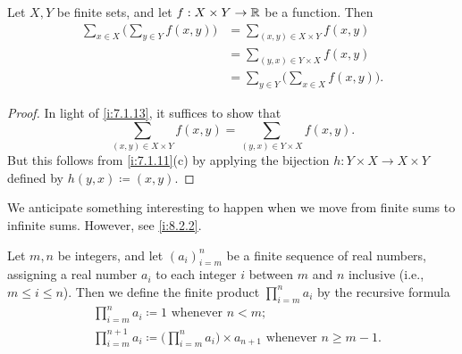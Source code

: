 \begin{cor}\label{i:7.1.14}
  Let \(X, Y\) be finite sets, and let \(f : X \times Y \to \mathbb{R}\) be a function.
  Then
  \begin{align*}
    \sum_{x \in X} \bigg(\sum_{y \in Y} f(x, y)\bigg) & = \sum_{(x, y) \in X \times Y} f(x, y)               \\
                                                      & = \sum_{(y, x) \in Y \times X} f(x, y)               \\
                                                      & = \sum_{y \in Y} \bigg(\sum_{x \in X} f(x, y)\bigg).
  \end{align*}
\end{cor}

\begin{proof}
  In light of \cref{i:7.1.13}, it suffices to show that
  \[
    \sum_{(x, y) \in X \times Y} f(x, y) = \sum_{(y, x) \in Y \times X} f(x, y).
  \]
  But this follows from \cref{i:7.1.11}(c) by applying the bijection \(h : Y \times X \to X \times Y\) defined by \(h(y, x) \coloneqq (x, y)\).
\end{proof}

\begin{rmk}\label{i:7.1.15}
  We anticipate something interesting to happen when we move from finite sums to infinite sums.
  However, see \cref{i:8.2.2}.
\end{rmk}

\begin{ac}\label{i:ac:7.1.1}
  Let \(m, n\) be integers, and let \((a_i)_{i = m}^n\) be a finite sequence of real numbers, assigning a real number \(a_i\) to each integer \(i\) between \(m\) and \(n\) inclusive (i.e., \(m \leq i \leq n\)).
  Then we define the finite product \(\prod_{i = m}^n a_i\) by the recursive formula
  \begin{align*}
     & \prod_{i = m}^n a_i \coloneqq 1 \text{ whenever } n < m;                                                             \\
     & \prod_{i = m}^{n + 1} a_i \coloneqq \Bigg(\prod_{i = m}^n a_i\Bigg) \times a_{n + 1} \text{ whenever } n \geq m - 1.
  \end{align*}
\end{ac}

